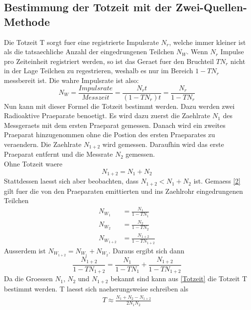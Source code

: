 \documentclass[titlepage=firstcover, captions=tableheading]{scrartcl}
\begin{document}
\subsection{Bestimmung der Totzeit mit der Zwei-Quellen-Methode}
Die Totzeit T sorgt fuer eine registrierte Impulsrate $N_r$, welche immer kleiner ist als die tatsaechliche Anzahl der eingedrungenen Teilchen $N_W$. Wenn $N_r$ Impulse pro Zeiteinheit registriert werden, so ist das Geraet fuer den Bruchteil $TN_r$ nicht in der Lage Teilchen zu regestrieren, weshalb es nur im Bereich $1-TN_r$ messbereit ist. Die wahre Impulsrate ist also:
\begin{equation}\label{2}
    N_W=\frac{Impulsrate}{Messzeit}=\frac{N_rt}{(1-TN_r)t}=\frac{N_r}{1-TN_r}
\end{equation}
Nun kann mit dieser Formel die Totzeit bestimmt werden. Dazu werden zwei Radioaktive Praeparate benoetigt. Es wird dazu zuerst die Zaehlrate $N_1$ des Messgeraets mit dem ersten Praeparat gemessen. Danach wird ein zweites Praeparat hinzugenommen ohne die Postion des ersten Praeparates zu veraendern. Die Zaehlrate $N_{1+2}$ wird gemessen. Daraufhin wird das erste Praeparat entfernt und die Messrate $N_2$ gemessen.\\
Ohne Totzeit waere 
\begin{equation}
    N_{1+2}=N_1+N_2\nonumber
\end{equation}
Stattdessen laesst sich aber beobachten, dass $N_{1+2}<N_1+N_2$ ist. Gemaess \ref{2} gilt fuer die von den Praeparaten emittierten und ins Zaehlrohr eingedrungenen Teilchen
\begin{align}
    N_{W_1}&=\frac{N_1}{1-TN_1}\nonumber\\
    N_{W_2}&=\frac{N_2}{1-TN_2}\nonumber\\
    N_{W_{1+2}}&=\frac{N_{1+2}}{1-TN_{1+2}}\nonumber
\end{align}
Ausserdem ist $N_{W_{1+2}}=N_{W_1}+N_{W_2}$. Daraus ergibt sich dann
\begin{equation}\label{Totzeit}
    \frac{N_{1+2}}{1-TN_{1+2}}=\frac{N_1}{1-TN_1}+\frac{N_{1+2}}{1-TN_{1+2}}
\end{equation}
Da die Groessen $N_1$, $N_2$ und $N_{1+2}$ bekannt sind kann aus \ref{Totzeit} die Totzeit T bestimmt werden. T laesst sich naeherungsweise schreiben als 
\begin{align}
    T\approx\frac{N_1+N_2-N_{1+2}}{2N_1N_2}
\end{align}
\end{document}
